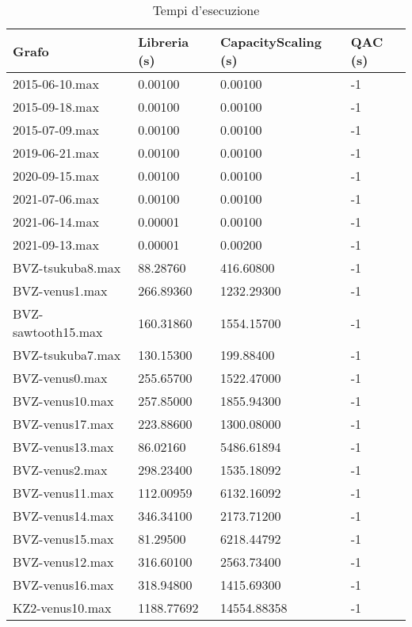 \documentclass{article}
\begin{document}
\begin{table}
    \caption{Tempi d'esecuzione}\label{tabella_tempi}
    \centering
    \begin{tabular}{|l|l|l|l|}
    \hline
        Grafo & Libreria (s) & CapacityScaling (s) & QAC (s) \\ \hline
        2015-06-10.max & 0.00100 & 0.00100 & -1 \\ \hline
        2015-09-18.max & 0.00100 & 0.00100 & -1 \\ \hline
        2015-07-09.max & 0.00100 & 0.00100 & -1 \\ \hline
        2019-06-21.max & 0.00100 & 0.00100 & -1 \\ \hline
        2020-09-15.max & 0.00100 & 0.00100 & -1 \\ \hline
        2021-07-06.max & 0.00100 & 0.00100 & -1 \\ \hline
        2021-06-14.max & 0.00001 & 0.00100 & -1 \\ \hline
        2021-09-13.max & 0.00001 & 0.00200 & -1 \\ \hline
        BVZ-tsukuba8.max & 88.28760 & 416.60800 & -1 \\ \hline
        BVZ-venus1.max & 266.89360 & 1232.29300 & -1 \\ \hline
        BVZ-sawtooth15.max & 160.31860 & 1554.15700 & -1 \\ \hline
        BVZ-tsukuba7.max & 130.15300 & 199.88400 & -1 \\ \hline
        BVZ-venus0.max & 255.65700 & 1522.47000 & -1 \\ \hline
        BVZ-venus10.max & 257.85000 & 1855.94300 & -1 \\ \hline
        BVZ-venus17.max & 223.88600 & 1300.08000 & -1 \\ \hline
        BVZ-venus13.max & 86.02160 & 5486.61894 & -1 \\ \hline
        BVZ-venus2.max & 298.23400 & 1535.18092 & -1 \\ \hline
        BVZ-venus11.max & 112.00959 & 6132.16092 & -1 \\ \hline
        BVZ-venus14.max & 346.34100 & 2173.71200 & -1 \\ \hline
        BVZ-venus15.max & 81.29500 & 6218.44792 & -1 \\ \hline
        BVZ-venus12.max & 316.60100 & 2563.73400 & -1 \\ \hline
        BVZ-venus16.max & 318.94800 & 1415.69300 & -1 \\ \hline
        KZ2-venus10.max & 1188.77692 & 14554.88358 & -1 \\ \hline

\end{tabular}
\end{table}
\end{document}
